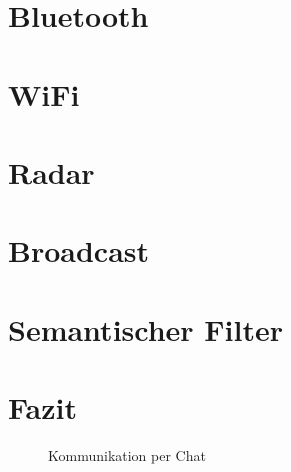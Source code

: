 \documentclass[12pt,a4paper,bibliography=totocnumbered,listof=totocnumbered]{scrartcl}
\begin{document}
\section{Bluetooth}


\section{WiFi}


\section{Radar}


\section{Broadcast}


\section{Semantischer Filter}


\section{Fazit}

\begin{figure}[H]
	\centering
	\hspace*{1cm}
	\caption{Kommunikation per Chat}
	\label{fig:communication}
\end{figure}
\newpage

\citet{*}


\pagebreak
\rhead{\rightmark}

\pagebreak




\end{document}
